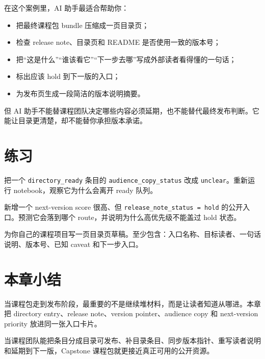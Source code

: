 在这个案例里，AI 助手最适合帮助你：

\begin{itemize}
    \item 把最终课程包 bundle 压缩成一页目录页；
    \item 检查 release note、目录页和 README 是否使用一致的版本号；
    \item 把“这是什么”“谁该看它”“下一步去哪”写成外部读者看得懂的一句话；
    \item 标出应该 hold 到下一版的入口；
    \item 为发布页生成一段简洁的版本说明摘要。
\end{itemize}

但 AI 助手不能替课程团队决定哪些内容必须延期，也不能替代最终发布判断。它能让目录更清楚，却不能替你承担版本承诺。

\section{练习}

\begin{exercisebox}[基础练习]
把一个 \texttt{directory\_ready} 条目的 \texttt{audience\_copy\_status} 改成 \texttt{unclear}。重新运行 notebook，观察它为什么会离开 ready 队列。
\end{exercisebox}

\begin{exercisebox}[进阶练习]
新增一个 next-version score 很高、但 \texttt{release\_note\_status = hold} 的公开入口。预测它会落到哪个 route，并说明为什么高优先级不能盖过 hold 状态。
\end{exercisebox}

\begin{exercisebox}[开放练习]
为你自己的课程项目写一页目录页草稿。至少包含：入口名称、目标读者、一句话说明、版本号、已知 caveat 和下一步入口。
\end{exercisebox}

\section{本章小结}

当课程包走到发布阶段，最重要的不是继续堆材料，而是让读者知道从哪进。本章把 directory entry、release note、version pointer、audience copy 和 next-version priority 放进同一张入口卡片。

当课程团队能把条目分成目录可发布、补目录条目、同步版本指针、重写读者说明和延期到下一版，Capstone 课程包就更接近真正可用的公开资源。
